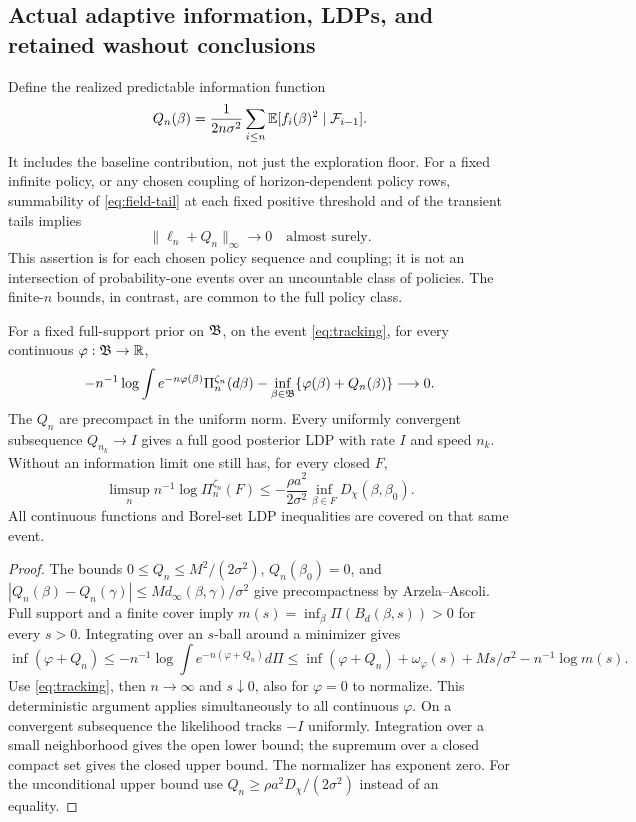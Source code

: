 \subsection{Actual adaptive information, LDPs, and retained washout conclusions}
Define the realized predictable information function
\[
 Q_n(\beta)=\frac1{2n\sigma^2}\sum_{i\le n}
       \mathbb E[f_i(\beta)^2\mid\mathcal F_{i-1}].
\]
It includes the baseline contribution, not just the exploration floor.
For a fixed infinite policy, or any chosen coupling of horizon-dependent
policy rows, summability of \eqref{eq:field-tail} at each fixed positive
threshold and of the transient tails implies
\begin{equation}
 \|\ell_n+Q_n\|_\infty\longrightarrow0\quad\text{almost surely}.
 \label{eq:tracking}
\end{equation}
This assertion is for each chosen policy sequence and coupling; it is not an
intersection of probability-one events over an uncountable class of policies.
The finite-$n$ bounds, in contrast, are common to the full policy class.

\begin{proposition}
\label{prop:ldp}
For a fixed full-support prior on $\mathfrak B$, on the event \eqref{eq:tracking},
for every continuous $\varphi:\mathfrak B\to\mathbb R$,
\[
 -n^{-1}\log\int e^{-n\varphi(\beta)}\Pi_n^{\zeta_n}(d\beta)
 -\inf_{\beta\in\mathfrak B}\{\varphi(\beta)+Q_n(\beta)\}\longrightarrow0.
\]
The $Q_n$ are precompact in the uniform norm. Every uniformly convergent
subsequence $Q_{n_k}\to I$ gives a full good posterior LDP with rate $I$ and
speed $n_k$. Without an information limit one still has, for every closed $F$,
\[
 \limsup_n n^{-1}\log\Pi_n^{\zeta_n}(F)
 \le-\frac{\rho a^2}{2\sigma^2}\inf_{\beta\in F}D_\chi(\beta,\beta_0).
\]
All continuous functions and Borel-set LDP inequalities are covered on that
same event.
\end{proposition}
\begin{proof}
The bounds $0\le Q_n\le M^2/(2\sigma^2)$,
$Q_n(\beta_0)=0$, and
$|Q_n(\beta)-Q_n(\gamma)|\le M d_\infty(\beta,\gamma)/\sigma^2$
give precompactness by Arzela--Ascoli. Full support and a finite cover imply
$m(s)=\inf_\beta\Pi(B_d(\beta,s))>0$ for every $s>0$. Integrating over an
$s$-ball around a minimizer gives
\[
 \inf(\varphi+Q_n)\le-n^{-1}\log\int e^{-n(\varphi+Q_n)}d\Pi
 \le\inf(\varphi+Q_n)+\omega_\varphi(s)+Ms/\sigma^2-n^{-1}\log m(s).
\]
Use \eqref{eq:tracking}, then $n\to\infty$ and $s\downarrow0$, also for
$\varphi=0$ to normalize. This deterministic argument applies simultaneously
to all continuous $\varphi$. On a convergent subsequence the likelihood tracks
$-I$ uniformly. Integration over a small neighborhood gives the open lower
bound; the supremum over a closed compact set gives the closed upper bound.
The normalizer has exponent zero. For the unconditional upper bound use
$Q_n\ge\rho a^2D_\chi/(2\sigma^2)$ instead of an equality.
\end{proof}

